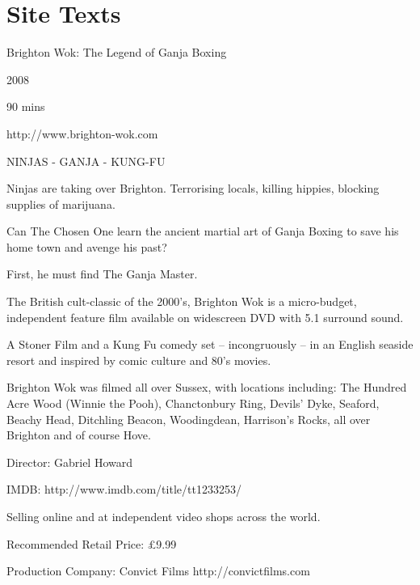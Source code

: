\def\documenttitle{Info Sheet}



\usepackage{wrapfig}



\bwokbigheader

\bwoktitle{\documenttitle}

\section{Site Texts}

Brighton Wok: The Legend of Ganja Boxing

2008

90 mins

http://www.brighton-wok.com

NINJAS - GANJA - KUNG-FU

Ninjas are taking over Brighton. Terrorising locals, killing hippies, blocking supplies of marijuana.
 
Can The Chosen One learn the ancient martial art of Ganja Boxing to save his home town and avenge his past?
 
First, he must find The Ganja Master.
 
The British cult-classic of the 2000’s, Brighton Wok is a micro-budget, independent feature film available on widescreen DVD with 5.1 surround sound.
 
A Stoner Film and a Kung Fu comedy set – incongruously – in an English seaside resort and inspired by comic culture and 80’s movies.
 
Brighton Wok was filmed all over Sussex, with locations including: The Hundred Acre Wood (Winnie the Pooh), Chanctonbury Ring, Devils' Dyke, Seaford, Beachy Head, Ditchling Beacon, Woodingdean, Harrison's Rocks, all over Brighton and of course Hove.

Director: Gabriel Howard

IMDB:  http://www.imdb.com/title/tt1233253/

Selling online and at independent video shops across the world.

Recommended Retail Price: £9.99

Production Company: Convict Films http://convictfilms.com








